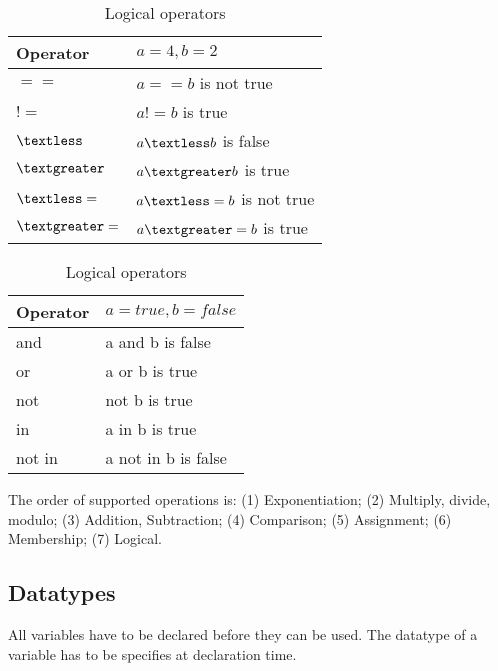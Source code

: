 \begin{table}[h]
\begin{center}
    \parbox{.4\linewidth}{
        \begin{tabular}{| l | l |}
        \hline
        Operator & $a=4, b=2$ \\ \hline
        $==$ & $a == b$ is not true \\ \hline
        $!=$ & $a != b$ is true \\ \hline
        $\textless$  & $a \textless b$ is false \\ \hline
        $\textgreater$  & $a \textgreater b$ is true \\ \hline
        $\textless=$ & $a \textless= b$ is not true \\ \hline
        $\textgreater=$ & $a \textgreater= b$ is true \\ \hline
        \end{tabular}
        \caption{Comparison operators.}
    }
    \parbox{.4\linewidth}{
        \begin{tabular}{| l | l |}
        \hline
        Operator & $a = true, b = false$ \\ \hline
        and & a and b is false \\ \hline
        or & a or b is true\\ \hline
        not & not b is true \\ \hline
        in & a in b is true \\ \hline
        not in & a not in b is false\\ \hline
        \end{tabular}
        \caption{Logical operators}
     }
\end{center}
\end{table}

The order of supported operations 
is: (1) Exponentiation; (2) Multiply, divide, modulo; (3) Addition, Subtraction; 
(4) Comparison; (5) Assignment; (6) Membership; (7) Logical.

\subsection{Datatypes}
All variables have to be declared before they can be used. The datatype of a
variable has to be specifies at declaration time.

